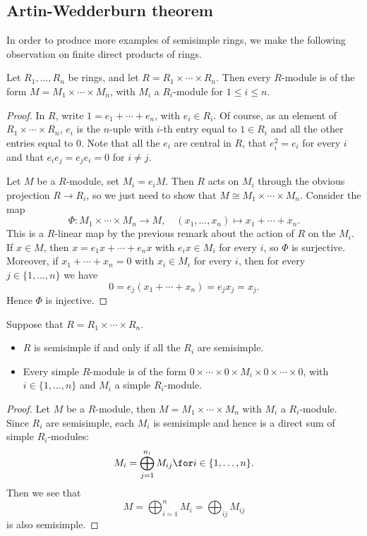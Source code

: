 \subsection{Artin-Wedderburn theorem}
In order to produce more examples of semisimple rings, we make the following observation on finite direct products of rings.
\begin{proposition}\label{submodule product ring}
Let $R_1,\dots,R_n$ be rings, and let $R=R_1\times\cdots\times R_n$. Then every $R$-module is of the form $M=M_1\times\cdots\times M_n$, with $M_i$ a $R_i$-module for $1\leq i\leq n$.
\end{proposition}
\begin{proof}
In $R$, write $1=e_1+\cdots+e_n$, with $e_i\in R_i$. Of course, as an element of $R_1\times\cdots\times R_n$, $e_i$ is the $n$-uple with $i$-th entry equal to $1\in R_i$ and all the other entries equal to $0$. Note that all the $e_i$ are central in $R$, that $e^2_i=e_i$ for every $i$ and that $e_ie_j=e_je_i=0$ for $i\neq j$.\par
Let $M$ be a $R$-module, set $M_i=e_iM$. Then $R$ acts on $M_i$ through the obvious projection $R\to R_i$, so we just need to show that $M\cong M_1\times\cdots\times M_n$. Consider the map
\[\varPhi:M_1\times\cdots\times M_n\to M,\quad (x_1,\dots,x_n)\mapsto x_1+\cdots+x_n.\]
This is a $R$-linear map by the previous remark about the action of $R$ on the $M_i$. If $x\in M$, then $x=e_1x+\cdots+e_nx$ with $e_ix\in M_i$ for every $i$, so $\varPhi$ is surjective. Moreover, if $x_1+\cdots+x_n=0$ with $x_i\in M_i$ for every $i$, then for every $j\in\{1,\dots,n\}$ we have 
\[0=e_j(x_1+\cdots+x_n)=e_jx_j=x_j.\] 
Hence $\varPhi$ is injective.
\end{proof}
\begin{corollary}\label{simple module product ring}
Suppose that $R=R_1\times\cdots\times R_n$.
\begin{itemize}
\item $R$ is semisimple if and only if all the $R_i$ are semisimple.
\item Every simple $R$-module is of the form $0\times\cdots\times0\times M_i\times0\times\cdots\times 0$, with $i\in\{1,\dots,n\}$ and $M_i$ a simple $R_i$-module.
\end{itemize}
\end{corollary}
\begin{proof}
Let $M$ be a $R$-module, then $M=M_1\times\cdots\times M_n$ with $M_i$ a $R_i$-module. Since $R_i$ are semisimple, each $M_i$ is semisimple and hence is a direct sum of simple $R_i$-modules:
\[M_i=\bigoplus_{j=1}^{n_i}M_{ij}\for i\in\{1,\dots,n\}.\]
Then we see that
\[M=\bigoplus_{i=1}^{n}M_i=\bigoplus_{ij}M_{ij}\]
is also semisimple.
\end{proof}
